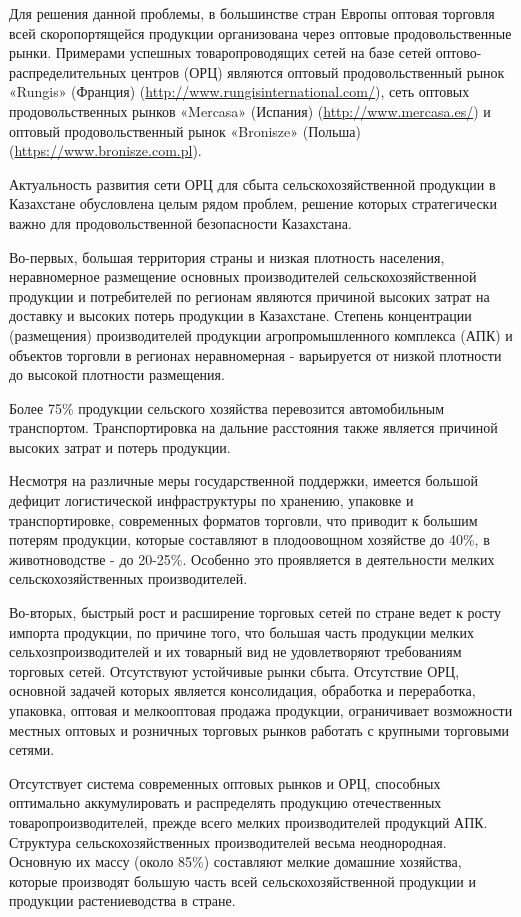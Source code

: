Для решения данной проблемы, в большинстве стран Европы оптовая торговля
всей скоропортящейся продукции организована через оптовые
продовольственные рынки. Примерами успешных товаропроводящих сетей на
базе сетей оптово-распределительных центров (ОРЦ) являются оптовый
продовольственный рынок «Rungis» (Франция)
(\url{http://www.rungisinternational.com/}), сеть
оптовых продовольственных рынков «Mercasa» (Испания)
(\url{http://www.mercasa.es/}) и оптовый продовольственный
рынок «Bronisze» (Польша)
(\href{https://www.bronisze.com.pl/ru}{https://www.bronisze.com.pl}).

Актуальность развития сети ОРЦ для сбыта сельскохозяйственной продукции
в Казахстане обусловлена целым рядом проблем, решение которых
стратегически важно для продовольственной безопасности Казахстана.

Во-первых, большая территория страны и низкая плотность населения,
неравномерное размещение основных производителей сельскохозяйственной
продукции и потребителей по регионам являются причиной высоких затрат на
доставку и высоких потерь продукции в Казахстане. Степень концентрации
(размещения) производителей продукции агропромышленного комплекса (АПК)
и объектов торговли в регионах неравномерная - варьируется от низкой
плотности до высокой плотности размещения.

Более 75\% продукции сельского хозяйства перевозится автомобильным
транспортом. Транспортировка на дальние расстояния также является
причиной высоких затрат и потерь продукции.

Несмотря на различные меры государственной поддержки, имеется большой
дефицит логистической инфраструктуры по хранению, упаковке и
транспортировке, современных форматов торговли, что приводит к большим
потерям продукции, которые составляют в плодоовощном хозяйстве до 40\%,
в животноводстве - до 20-25\%. Особенно это проявляется в деятельности
мелких сельскохозяйственных производителей.

Во-вторых, быстрый рост и расширение торговых сетей по стране ведет к
росту импорта продукции, по причине того, что большая часть продукции
мелких сельхозпроизводителей и их товарный вид не удовлетворяют
требованиям торговых сетей. Отсутствуют устойчивые рынки сбыта.
Отсутствие ОРЦ, основной задачей которых является консолидация,
обработка и переработка, упаковка, оптовая и мелкооптовая продажа
продукции, ограничивает возможности местных оптовых и розничных торговых
рынков работать с крупными торговыми сетями.

Отсутствует система современных оптовых рынков и ОРЦ, способных
оптимально аккумулировать и распределять продукцию отечественных
товаропроизводителей, прежде всего мелких производителей продукций АПК.
Структура сельскохозяйственных производителей весьма неоднородная.
Основную их массу (около 85\%) составляют мелкие домашние хозяйства,
которые производят большую часть всей сельскохозяйственной продукции и
продукции растениеводства в стране.

